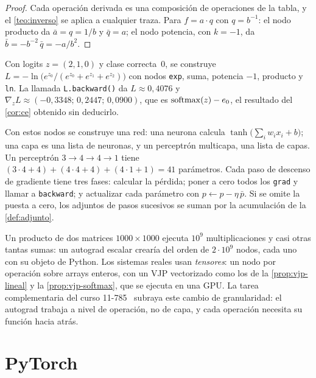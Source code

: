 \begin{proof}
Cada operación derivada es una composición de operaciones de la tabla, y el \cref{teo:inverso} se aplica a cualquier traza. Para $f=a\cdot q$ con $q=b^{-1}$: el nodo producto da $\bar a=q=1/b$ y $\bar q=a$; el nodo potencia, con $k=-1$, da $\bar b=-b^{-2}\,\bar q=-a/b^{2}$.
\end{proof}

\begin{ejemplo}\label{ej:ce-micro}
Con logits $z=(2,1,0)$ y clase correcta~0, se construye $L=-\ln\bigl(e^{z_0}/(e^{z_0}+e^{z_1}+e^{z_2})\bigr)$ con nodos \texttt{exp}, suma, potencia $-1$, producto y \texttt{ln}. La llamada \texttt{L.backward()} da $L\approx 0{,}4076$ y $\nabla_{\!z}L\approx(-0{,}3348;\,0{,}2447;\,0{,}0900)$, que es $\operatorname{softmax}(z)-e_0$, el resultado del \cref{cor:ce} obtenido sin deducirlo.
\end{ejemplo}

Con estos nodos se construye una red: una neurona calcula $\tanh\bigl(\sum_iw_ix_i+b\bigr)$; una capa es una lista de neuronas, y un perceptrón multicapa, una lista de capas. Un perceptrón $3\to 4\to 4\to 1$ tiene $(3\cdot 4+4)+(4\cdot 4+4)+(4\cdot 1+1)=41$ parámetros. Cada paso de descenso de gradiente tiene tres fases: calcular la pérdida; poner a cero todos los \texttt{grad} y llamar a \texttt{backward}; y actualizar cada parámetro con $p\gets p-\eta\,\bar p$. Si se omite la puesta a cero, los adjuntos de pasos sucesivos se suman por la acumulación de la \cref{def:adjunto}.

\begin{observacion}
Un producto de dos matrices $1000\times 1000$ ejecuta $10^{9}$ multiplicaciones y casi otras tantas sumas: un autograd escalar crearía del orden de $2\cdot 10^{9}$ nodos, cada uno con su objeto de Python. Los sistemas reales usan \emph{tensores}: un nodo por operación sobre arrays enteros, con un VJP vectorizado como los de la \cref{prop:vjp-lineal} y la \cref{prop:vjp-softmax}, que se ejecuta en una GPU. La tarea complementaria del curso 11-785~\cite[§1 y §3.2]{cmu11785} subraya este cambio de granularidad: el autograd trabaja a nivel de operación, no de capa, y cada operación necesita su función hacia atrás.
\end{observacion}

\section{PyTorch}

